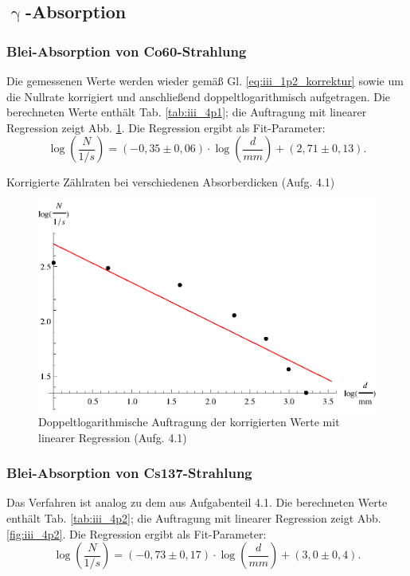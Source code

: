 \subsection{\texorpdfstring{$\upgamma$}{Gamma}-Absorption}
\subsubsection{Blei-Absorption von Co60-Strahlung}
Die gemessenen Werte werden wieder gemäß Gl. \eqref{eq:iii_1p2_korrektur} sowie um die Nullrate korrigiert und anschließend doppeltlogarithmisch aufgetragen. Die berechneten Werte enthält Tab. \ref{tab:iii_4p1}; die Auftragung mit linearer Regression zeigt Abb. \ref{fig:iii_4p1}. Die Regression ergibt als Fit-Parameter:
\begin{equation}
\log\left(\frac{N}{\si{1/s}}\right) = (-0,35 \pm 0,06) \cdot \log\left(\frac{d}{\si{mm}}\right) + (2,71 \pm 0,13).
\end{equation}

\begin{table}[p]
\centering
\caption{Korrigierte Zählraten bei verschiedenen Absorberdicken (Aufg. 4.1)}
\label{tab:iii_4p1}

\end{table}

\begin{figure}[p]
\centering
\includegraphics[scale=1.0]{fig/iii_4p1.eps}
\caption{Doppeltlogarithmische Auftragung der korrigierten Werte mit linearer Regression (Aufg. 4.1)}
\label{fig:iii_4p1}
\end{figure}

\subsubsection{Blei-Absorption von Cs137-Strahlung}
Das Verfahren ist analog zu dem aus Aufgabenteil 4.1. Die berechneten Werte enthält Tab. \ref{tab:iii_4p2}; die Auftragung mit linearer Regression zeigt Abb. \ref{fig:iii_4p2}. Die Regression ergibt als Fit-Parameter:
\begin{equation}
\log\left(\frac{N}{\si{1/s}}\right) = (-0,73 \pm 0,17) \cdot \log\left(\frac{d}{\si{mm}}\right) + (3,0 \pm 0,4).
\end{equation}

